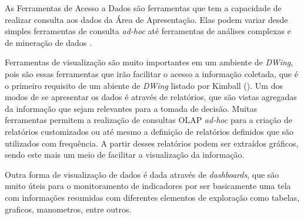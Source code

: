 As Ferramentas de Acesso a Dados são ferramentas que tem a capacidade de realizar consulta aos dados da Área de Apresentação. Elas podem variar desde simples ferramentas de consulta \emph{ad-hoc} até ferramentas de análises complexas e de mineração de dados \cite{kimball2002}.

Ferramentas de visualização são muito importantes em um ambiente de \emph{DWing}, pois são essas ferramentas que irão facilitar o acesso a informação coletada, que é o primeiro requisito de um abiente de \emph{DWing} listado por Kimball (\citeyear{kimball2002}). Um dos modos de se apresentar os dados é através de relatórios, que são vistas agregadas da informação que sejam relevantes para a tomada de decisão. Muitas ferramentas permitem a realização de consultas OLAP \emph{ad-hoc} para a criação de relatórios customizados ou até mesmo a definição de relatórios definidos que são utilizados com frequência. A partir desses relatórios podem ser extraídos gráficos, sendo este mais um meio de facilitar a visualização da informação. 

Outra forma de visualização de dados é dada através  de \emph{dashboards}, que são muito úteis para o monitoramento de indicadores por ser basicamente uma tela com informações resumidas com diferentes elementos de exploração como tabelas, graficos, manometros, entre outros.




